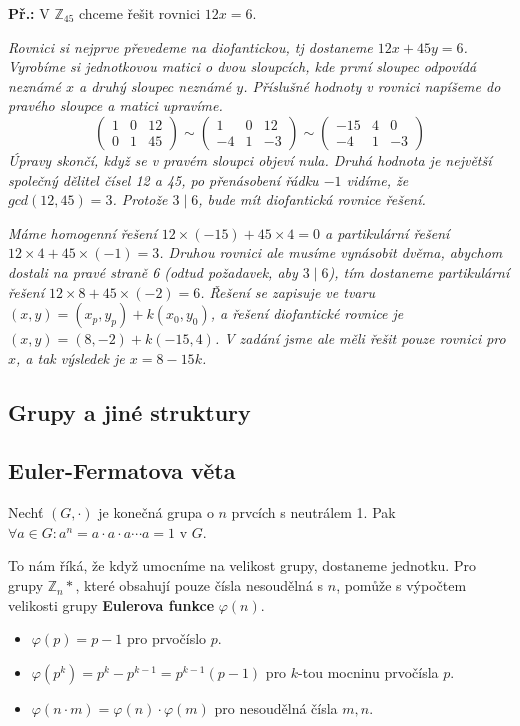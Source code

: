\documentclass[10pt,a4paper]{article}
\begin{document}
\textbf{Př.:} V $\mathbb{Z}_{45}$ chceme řešit rovnici $12x = 6$.

\textit{Rovnici si nejprve převedeme na diofantickou, tj dostaneme $12x + 45y = 6$. Vyrobíme si jednotkovou matici o dvou sloupcích, kde první sloupec odpovídá neznámé $x$ a druhý sloupec neznámé $y$. Příslušné hodnoty v rovnici napíšeme do pravého sloupce a matici upravíme.}
\[ \left( \begin{array}{cc|c}
1 & 0 & 12\\
0 & 1 & 45
\end{array} \right)
%
\sim
%
\left( \begin{array}{cc|c}
1 & 0 & 12\\
-4 & 1 & -3
\end{array} \right)
%
\sim
%
\left( \begin{array}{cc|c}
-15 & 4 & 0\\
-4 & 1 & -3
\end{array} \right)
\]
\textit{Úpravy skončí, když se v pravém sloupci objeví nula. Druhá hodnota je největší společný dělitel čísel 12 a 45, po přenásobení řádku $-1$ vidíme, že $gcd(12,45)=3$. Protože $3 \mid 6$, bude mít diofantická rovnice řešení.}

\textit{Máme homogenní řešení $12\times(-15) + 45\times 4 = 0$ a partikulární řešení $12\times4 + 45\times(-1) = 3$. Druhou rovnici ale musíme vynásobit dvěma, abychom dostali na pravé straně 6 (odtud požadavek, aby $3\mid6$), tím dostaneme partikulární řešení $12\times8 + 45\times(-2) = 6$. Řešení se zapisuje ve tvaru $(x,y) = (x_p,y_p) + k(x_0,y_0)$, a řešení diofantické rovnice je $(x,y) = (8, -2) + k(-15,4)$. V zadání jsme ale měli řešit pouze rovnici pro $x$, a tak výsledek je $x = 8 - 15k$.}

\subsection{Grupy a jiné struktury}

\subsection{Euler-Fermatova věta}
Nechť $(G,\cdot)$ je konečná grupa o $n$ prvcích s neutrálem 1. Pak $\forall a \in G: a^n = a\cdot a\cdot a\cdots a = 1$ v $G$.

To nám říká, že když umocníme na velikost grupy, dostaneme jednotku. Pro grupy $\mathbb{Z}_n*$, které obsahují pouze čísla nesoudělná s $n$, pomůže s výpočtem velikosti grupy \textbf{Eulerova funkce} $\varphi(n)$.
\begin{itemize}
\item $\varphi(p) = p-1$ pro prvočíslo $p$.
\item $\varphi(p^k) = p^k - p^{k-1} = p^{k-1}(p-1)$ pro $k$-tou mocninu prvočísla $p$.
\item $\varphi(n\cdot m) = \varphi(n)\cdot\varphi(m)$ pro nesoudělná čísla $m,n$.
\end{itemize}
\end{document}
